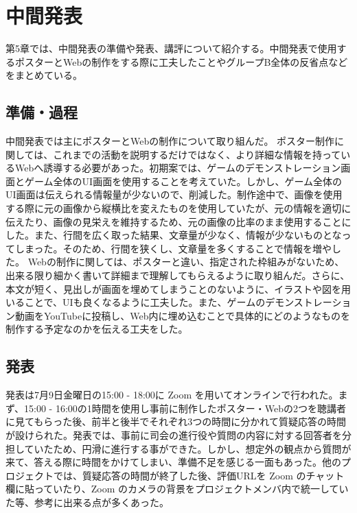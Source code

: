 \chapter{中間発表}
第5章では、中間発表の準備や発表、講評について紹介する。中間発表で使用するポスターとWebの制作をする際に工夫したことやグループB全体の反省点などをまとめている。
\section{準備・過程}
中間発表では主にポスターとWebの制作について取り組んだ。
ポスター制作に関しては、これまでの活動を説明するだけではなく、より詳細な情報を持っているWebへ誘導する必要があった。初期案では、ゲームのデモンストレーション画面とゲーム全体のUI画面を使用することを考えていた。しかし、ゲーム全体のUI画面は伝えられる情報量が少ないので、削減した。制作途中で、画像を使用する際に元の画像から縦横比を変えたものを使用していたが、元の情報を適切に伝えたり、画像の見栄えを維持するため、元の画像の比率のまま使用することにした。また、行間を広く取った結果、文章量が少なく、情報が少ないものとなってしまった。そのため、行間を狭くし、文章量を多くすることで情報を増やした。
Webの制作に関しては、ポスターと違い、指定された枠組みがないため、出来る限り細かく書いて詳細まで理解してもらえるように取り組んだ。さらに、本文が短く、見出しが画面を埋めてしまうことのないように、イラストや図を用いることで、UIも良くなるように工夫した。また、ゲームのデモンストレーション動画をYouTubeに投稿し、Web内に埋め込むことで具体的にどのようなものを制作する予定なのかを伝える工夫をした。

\section{発表}
発表は7月9日金曜日の15:00 - 18:00に Zoom を用いてオンラインで行われた。まず、15:00 - 16:00の1時間を使用し事前に制作したポスター・Webの2つを聴講者に見てもらった後、前半と後半でそれぞれ3つの時間に分かれて質疑応答の時間が設けられた。発表では、事前に司会の進行役や質問の内容に対する回答者を分担していたため、円滑に進行する事ができた。しかし、想定外の観点から質問が来て、答える際に時間をかけてしまい、準備不足を感じる一面もあった。他のプロジェクトでは、質疑応答の時間が終了した後、評価URLを Zoom のチャット欄に貼っていたり、Zoom のカメラの背景をプロジェクトメンバ内で統一していた等、参考に出来る点が多くあった。

\newpage
